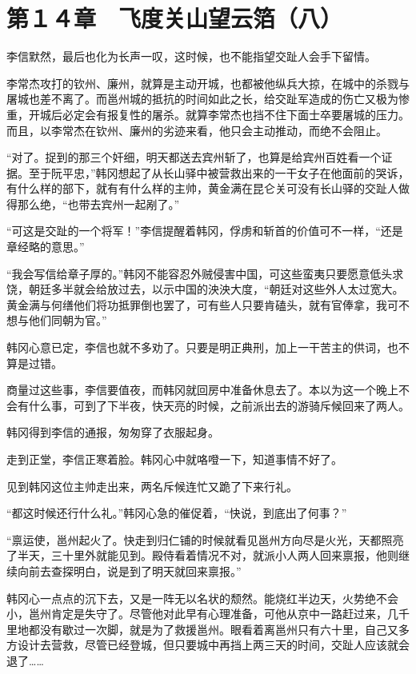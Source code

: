 \section{第１４章　飞度关山望云箔（八）}

李信默然，最后也化为长声一叹，这时候，也不能指望交趾人会手下留情。

李常杰攻打的钦州、廉州，就算是主动开城，也都被他纵兵大掠，在城中的杀戮与屠城也差不离了。而邕州城的抵抗的时间如此之长，给交趾军造成的伤亡又极为惨重，开城后必定会有报复性的屠杀。就算李常杰也挡不住下面士卒要屠城的压力。而且，以李常杰在钦州、廉州的劣迹来看，他只会主动推动，而绝不会阻止。

“对了。捉到的那三个奸细，明天都送去宾州斩了，也算是给宾州百姓看一个证据。至于阮平忠，”韩冈想起了从长山驿中被营救出来的一干女子在他面前的哭诉，有什么样的部下，就有有什么样的主帅，黄金满在昆仑关可没有长山驿的交趾人做得那么绝，“也带去宾州一起剐了。”

“可这是交趾的一个将军！”李信提醒着韩冈，俘虏和斩首的价值可不一样，“还是章经略的意思。”

“我会写信给章子厚的。”韩冈不能容忍外贼侵害中国，可这些蛮夷只要愿意低头求饶，朝廷多半就会给放过去，以示中国的泱泱大度，“朝廷对这些外人太过宽大。黄金满与何缮他们将功抵罪倒也罢了，可有些人只要肯磕头，就有官俸拿，我可不想与他们同朝为官。”

韩冈心意已定，李信也就不多劝了。只要是明正典刑，加上一干苦主的供词，也不算是过错。

商量过这些事，李信要值夜，而韩冈就回房中准备休息去了。本以为这一个晚上不会有什么事，可到了下半夜，快天亮的时候，之前派出去的游骑斥候回来了两人。

韩冈得到李信的通报，匆匆穿了衣服起身。

走到正堂，李信正寒着脸。韩冈心中就咯噔一下，知道事情不好了。

见到韩冈这位主帅走出来，两名斥候连忙又跪了下来行礼。

“都这时候还行什么礼。”韩冈心急的催促着，“快说，到底出了何事？”

“禀运使，邕州起火了。快走到归仁铺的时候就看见邕州方向尽是火光，天都照亮了半天，三十里外就能见到。殿侍看着情况不对，就派小人两人回来禀报，他则继续向前去查探明白，说是到了明天就回来禀报。”

韩冈心一点点的沉下去，又是一阵无以名状的颓然。能烧红半边天，火势绝不会小，邕州肯定是失守了。尽管他对此早有心理准备，可他从京中一路赶过来，几千里地都没有歇过一次脚，就是为了救援邕州。眼看着离邕州只有六十里，自己又多方设计去营救，尽管已经登城，但只要城中再挡上两三天的时间，交趾人应该就会退了……

